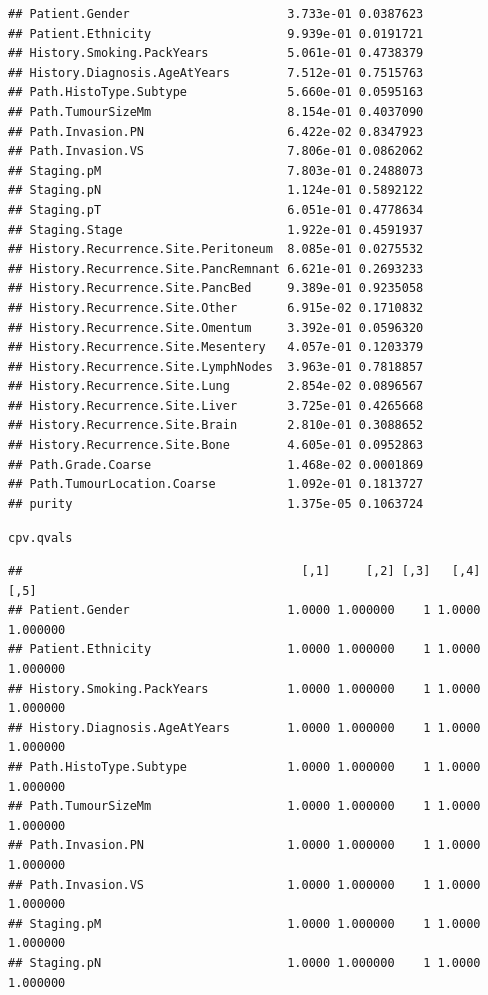 \documentclass{article}\usepackage[]{graphicx}\usepackage[]{color}
\makeatletter
\newcommand{\hlstd}[1]{\textcolor[rgb]{0.345,0.345,0.345}{#1}}%
\newenvironment{kframe}{%
 \def\at@end@of@kframe{}%
 \ifinner\ifhmode%
  \def\at@end@of@kframe{\end{minipage}}%
  \begin{minipage}{\columnwidth}%
 \fi\fi%
 \def\FrameCommand##1{\hskip\@totalleftmargin \hskip-\fboxsep
 \colorbox{shadecolor}{##1}\hskip-\fboxsep
     \hskip-\linewidth \hskip-\@totalleftmargin \hskip\columnwidth}%
 \MakeFramed {\advance\hsize-\width
   \@totalleftmargin\z@ \linewidth\hsize
   \@setminipage}}%
 {\par\unskip\endMakeFramed%
 \at@end@of@kframe}
\newenvironment{knitrout}{}{} %
\makeatother
\begin{document}
\begin{knitrout}
\begin{kframe}
\begin{verbatim}
## Patient.Gender                      3.733e-01 0.0387623
## Patient.Ethnicity                   9.939e-01 0.0191721
## History.Smoking.PackYears           5.061e-01 0.4738379
## History.Diagnosis.AgeAtYears        7.512e-01 0.7515763
## Path.HistoType.Subtype              5.660e-01 0.0595163
## Path.TumourSizeMm                   8.154e-01 0.4037090
## Path.Invasion.PN                    6.422e-02 0.8347923
## Path.Invasion.VS                    7.806e-01 0.0862062
## Staging.pM                          7.803e-01 0.2488073
## Staging.pN                          1.124e-01 0.5892122
## Staging.pT                          6.051e-01 0.4778634
## Staging.Stage                       1.922e-01 0.4591937
## History.Recurrence.Site.Peritoneum  8.085e-01 0.0275532
## History.Recurrence.Site.PancRemnant 6.621e-01 0.2693233
## History.Recurrence.Site.PancBed     9.389e-01 0.9235058
## History.Recurrence.Site.Other       6.915e-02 0.1710832
## History.Recurrence.Site.Omentum     3.392e-01 0.0596320
## History.Recurrence.Site.Mesentery   4.057e-01 0.1203379
## History.Recurrence.Site.LymphNodes  3.963e-01 0.7818857
## History.Recurrence.Site.Lung        2.854e-02 0.0896567
## History.Recurrence.Site.Liver       3.725e-01 0.4265668
## History.Recurrence.Site.Brain       2.810e-01 0.3088652
## History.Recurrence.Site.Bone        4.605e-01 0.0952863
## Path.Grade.Coarse                   1.468e-02 0.0001869
## Path.TumourLocation.Coarse          1.092e-01 0.1813727
## purity                              1.375e-05 0.1063724
\end{verbatim}
\begin{alltt}
\hlstd{cpv.qvals}
\end{alltt}
\begin{verbatim}
##                                       [,1]     [,2] [,3]   [,4]     [,5]
## Patient.Gender                      1.0000 1.000000    1 1.0000 1.000000
## Patient.Ethnicity                   1.0000 1.000000    1 1.0000 1.000000
## History.Smoking.PackYears           1.0000 1.000000    1 1.0000 1.000000
## History.Diagnosis.AgeAtYears        1.0000 1.000000    1 1.0000 1.000000
## Path.HistoType.Subtype              1.0000 1.000000    1 1.0000 1.000000
## Path.TumourSizeMm                   1.0000 1.000000    1 1.0000 1.000000
## Path.Invasion.PN                    1.0000 1.000000    1 1.0000 1.000000
## Path.Invasion.VS                    1.0000 1.000000    1 1.0000 1.000000
## Staging.pM                          1.0000 1.000000    1 1.0000 1.000000
## Staging.pN                          1.0000 1.000000    1 1.0000 1.000000

\end{verbatim}
\end{kframe}
\end{knitrout}
\end{document}
